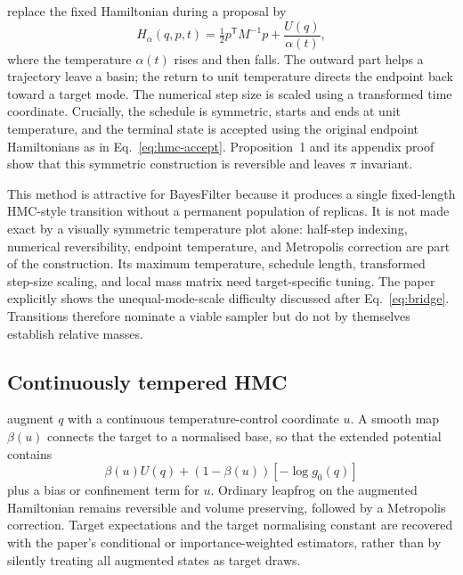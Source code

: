 \documentclass[11pt]{article}
\begin{document}
\citet{park2025athmc} replace the fixed Hamiltonian during a proposal by
\begin{equation}
 H_\alpha(q,p,t)=\tfrac12p^\mathsf{T}M^{-1}p+\frac{U(q)}{\alpha(t)},
 \label{eq:park-hamiltonian}
\end{equation}
where the temperature $\alpha(t)$ rises and then falls.  The outward part helps a
trajectory leave a basin; the return to unit temperature directs the endpoint back
toward a target mode.  The numerical step size is scaled using a transformed time
coordinate.  Crucially, the schedule is symmetric, starts and ends at unit
temperature, and the terminal state is accepted using the original endpoint
Hamiltonians as in Eq.~\eqref{eq:hmc-accept}.  Proposition~1 and its appendix proof
show that this symmetric construction is reversible and leaves $\pi$ invariant.

This method is attractive for BayesFilter because it produces a single fixed-length
HMC-style transition without a permanent population of replicas.  It is not made
exact by a visually symmetric temperature plot alone: half-step indexing, numerical
reversibility, endpoint temperature, and Metropolis correction are part of the
construction.  Its maximum temperature, schedule length, transformed step-size
scaling, and local mass matrix need target-specific tuning.  The paper explicitly
shows the unequal-mode-scale difficulty discussed after Eq.~\eqref{eq:bridge}.
Transitions therefore nominate a viable sampler but do not by themselves establish
relative masses.

\subsection{Continuously tempered HMC}

\citet{graham2017continuous} augment $q$ with a continuous temperature-control
coordinate $u$.  A smooth map $\beta(u)$ connects the target to a normalised base,
so that the extended potential contains
\begin{equation}
  \beta(u)U(q)+(1-\beta(u))[-\log g_0(q)]
\end{equation}
plus a bias or confinement term for $u$.  Ordinary leapfrog on the augmented
Hamiltonian remains reversible and volume preserving, followed by a Metropolis
correction.  Target expectations and the target normalising constant are recovered
with the paper's conditional or importance-weighted estimators, rather than by
silently treating all augmented states as target draws.
\end{document}
